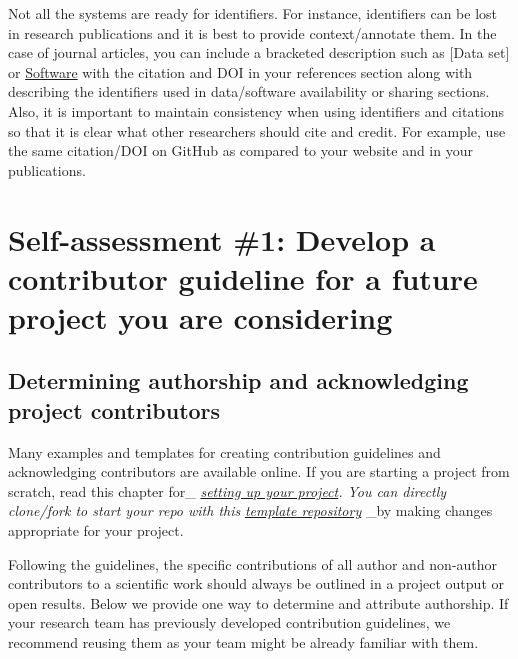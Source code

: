 \documentclass[
  letterpaper,
  DIV=11,
  numbers=noendperiod]{scrreport}
\begin{document}
Not all the systems are ready for identifiers. For instance, identifiers
can be lost in research publications and it is best to provide
context/annotate them. In the case of journal articles, you can include
a bracketed description such as {[}Data set{]} or
\protect\hyperlink{software}{Software} with the citation and DOI in your
references section along with describing the identifiers used in
data/software availability or sharing sections. Also, it is important to
maintain consistency when using identifiers and citations so that it is
clear what other researchers should cite and credit. For example, use
the same citation/DOI on GitHub as compared to your website and in your
publications.

\hypertarget{self-assessment-1-develop-a-contributor-guideline-for-a-future-project-you-are-considering}{%
\section{Self-assessment \#1: Develop a contributor guideline for a
future project you are
considering}\label{self-assessment-1-develop-a-contributor-guideline-for-a-future-project-you-are-considering}}

\hypertarget{determining-authorship-and-acknowledging-project-contributors}{%
\subsection{Determining authorship and acknowledging project
contributors}\label{determining-authorship-and-acknowledging-project-contributors}}

Many examples and templates for creating contribution guidelines and
acknowledging contributors are available online. If you are starting a
project from scratch, read this chapter for\_
\href{https://the-turing-way.netlify.app/project-design/project-repo.html}{\emph{setting
up your project}}\emph{. You can directly clone/fork to start your repo
with this}
\href{https://github.com/alan-turing-institute/reproducible-project-template}{\emph{template
repository}} \_by making changes appropriate for your project.

Following the guidelines, the specific contributions of all author and
non-author contributors to a scientific work should always be outlined
in a project output or open results. Below we provide one way to
determine and attribute authorship. If your research team has previously
developed contribution guidelines, we recommend reusing them as your
team might be already familiar with them.
\end{document}
